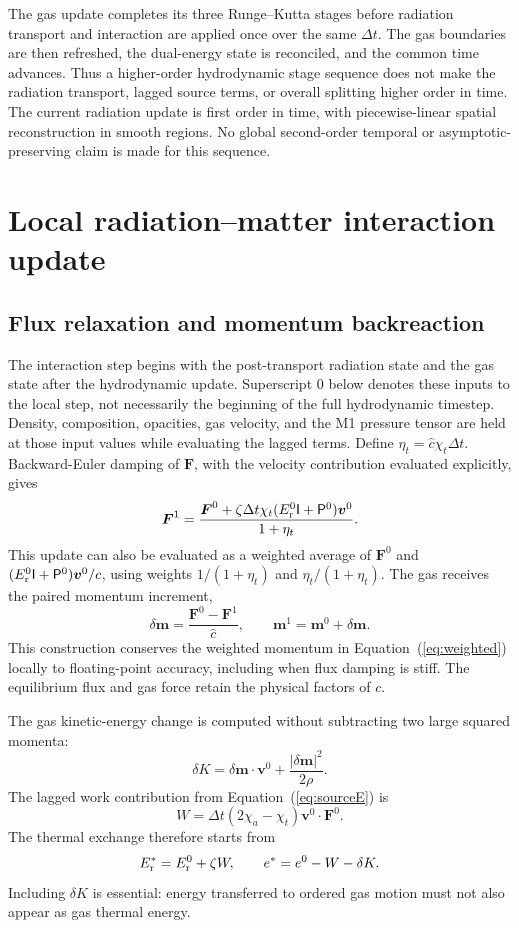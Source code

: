 \documentclass[manuscript]{aastex7}
\newcommand{\vct}[1]{\boldsymbol{#1}}
\newcommand{\Er}{E_{\rm r}}
\newcommand{\Fr}{\vct{F}}
\newcommand{\Prad}{\mathsf{P}}
\newcommand{\Id}{\mathsf{I}}
\newcommand{\dt}{\Delta t}
\newcommand{\chat}{\hat{c}}
\begin{document}
The gas update completes its three Runge--Kutta stages before radiation
transport and interaction are applied once over the same $\dt$. The
gas boundaries are then refreshed, the dual-energy state is reconciled,
and the common time advances. Thus a higher-order hydrodynamic stage
sequence does not make the radiation transport, lagged source terms, or
overall splitting higher order in time. The current radiation update is
first order in time, with piecewise-linear spatial reconstruction in
smooth regions. No global second-order temporal or asymptotic-preserving
claim is made for this sequence.

\section{Local radiation--matter interaction update}
\subsection{Flux relaxation and momentum backreaction}
The interaction step begins with the post-transport radiation state and
the gas state after the hydrodynamic update. Superscript $0$ below denotes
these inputs to the local step, not necessarily the beginning of the full
hydrodynamic timestep. Density, composition, opacities, gas velocity, and
the M1 pressure tensor are held at those input values while evaluating
the lagged terms. Define $\eta_t=\chat\chi_t\dt$. Backward-Euler damping of
$\Fr$, with the velocity contribution evaluated explicitly, gives
\begin{equation}
 \Fr^1=\frac{\Fr^0+\zeta\dt\chi_t(\Er^0\Id+\Prad^0)\vct{v}^0}
                  {1+\eta_t}.
 \label{eq:fluxrelax}
\end{equation}
This update can also be evaluated as a weighted average of $\Fr^0$ and
$(\Er^0\Id+\Prad^0)\vct{v}^0/c$, using weights
$1/(1+\eta_t)$ and $\eta_t/(1+\eta_t)$.
The gas receives the paired momentum increment,
\begin{equation}
 \delta\vct{m}=\frac{\Fr^0-\Fr^1}{\chat},\qquad
 \vct{m}^1=\vct{m}^0+\delta\vct{m}.
 \label{eq:dm}
\end{equation}
This construction conserves the weighted momentum in
Equation~(\ref{eq:weighted}) locally to floating-point accuracy,
including when flux damping is stiff. The equilibrium flux and gas
force retain the physical factors of $c$.

The gas kinetic-energy change is computed without subtracting two
large squared momenta:
\begin{equation}
 \delta K=\delta\vct{m}\cdot\vct{v}^0+
                 \frac{|\delta\vct{m}|^2}{2\rho}.
 \label{eq:dK}
\end{equation}
The lagged work contribution from Equation~(\ref{eq:sourceE}) is
\begin{equation}
 W=\dt(2\chi_a-\chi_t)\vct{v}^0\cdot\Fr^0.
\end{equation}
The thermal exchange therefore starts from
\begin{equation}
 \Er^*=\Er^0+\zeta W,\qquad e^*=e^0-W-\delta K.
 \label{eq:star}
\end{equation}
Including $\delta K$ is essential: energy transferred to ordered gas
motion must not also appear as gas thermal energy.
\end{document}
